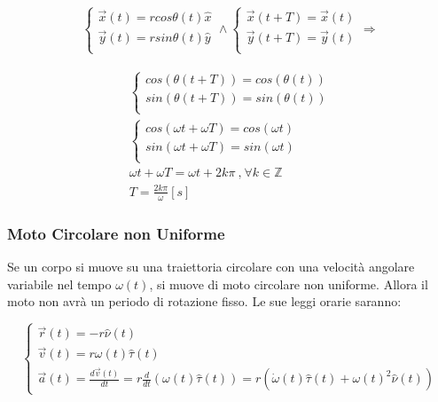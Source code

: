 \documentclass{article}
\numberwithin{equation}{subsection}
\begin{document}
\begin{align}
    \begin{cases}
        \vec{x}(t)=rcos\theta(t)\hat{x}\\
        \vec{y}(t)=rsin\theta(t)\hat{y}\\
    \end{cases}
    \land
    \begin{cases}
        \vec{x}(t+T)=\vec{x}(t)\\
        \vec{y}(t+T)=\vec{y}(t)\\
    \end{cases}\Rightarrow
\end{align}


\begin{gather}
    \begin{cases}
        cos(\theta(t+T))=cos(\theta(t))\\
        sin(\theta(t+T))=sin(\theta(t))\\
    \end{cases}\\
    \begin{cases}
        cos(\omega t +\omega T)=cos(\omega t)\\
        sin(\omega t + \omega T)=sin(\omega  t)\\
    \end{cases}\\
    \omega t +\omega T =\omega t + 2k\pi\:\mbox{,}\:\forall k \in \mathbb{Z}\\
    T=\displaystyle\frac{2k\pi}{\omega}[s]
\end{gather}

\subsubsection{Moto Circolare non Uniforme}
Se un corpo si muove su una traiettoria circolare con 
una velocità angolare variabile nel tempo $\omega(t)$, si muove di moto 
circolare non uniforme. Allora il moto non avrà un periodo 
di rotazione fisso. Le sue leggi orarie saranno:

\begin{equation}
    \begin{cases}
        \vec{r}(t)=-r\hat{\nu}(t)\\
        \vec{v}(t)=r\omega(t)\hat{\tau}(t)\\
        \vec{a}(t)=\displaystyle\frac{d\vec{v}(t)}{dt}
        =r\frac{d}{dt}(\omega(t)\hat{\tau}(t))
        =r(\dot\omega(t)\hat{\tau}(t)+\omega(t)^{2}\hat{\nu}(t))
    \end{cases}
\end{equation}
\end{document}
